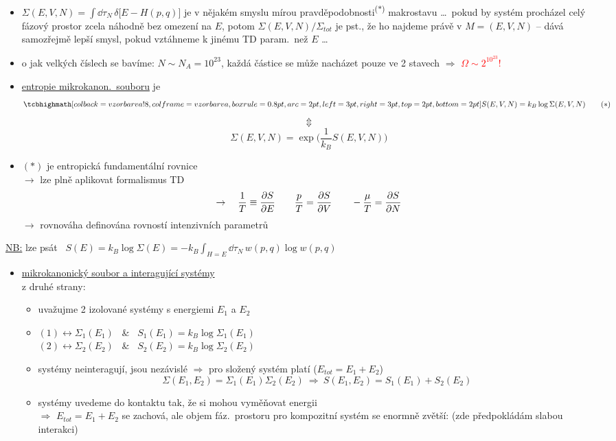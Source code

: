 \begin{itemize}
  \item $\Sigma(E,V,N) = \int\dd\tau_N\,\delta\big[E - H(p,q)\big]$ je v nějakém smyslu mírou pravděpodobnosti\textsuperscript{\textcolor{NavyBlue}{($*$)}} makrostavu \dots\ pokud by systém procházel celý fázový prostor zcela náhodně bez omezení na $E$, potom $\Sigma(E,V,N)/\Sigma_{tot}$ je pst., že ho najdeme právě v $M = (E,V,N)$
        \textcolor{NavyBlue}{-- dává samozřejmě lepší smysl, pokud vztáhneme k jinému TD param.\ než $E$ \dots}
  \item o jak velkých číslech se bavíme: $N\sim N_A = 10^{23}$, každá částice se může nacházet pouze ve 2 stavech $\Rightarrow$ \textcolor{Red}{$\Omega\sim 2^{10^{23}}$!}
  \item \underline{entropie mikrokanon.\ souboru} je
  \[
    \vzorec{S(E,V,N) = k_B\log\Sigma(E,V,N)} \qquad (*)
  \]
  \[
    \Updownarrow
  \]
  \[
    \Sigma(E,V,N) = \exp\Big(\frac{1}{k_B}S(E,V,N)\Big)
  \]
  \item $(*)$ je entropická fundamentální rovnice \\
        $\to$ lze plně aplikovat formalismus TD
        \[
          \to\quad \frac1T \equiv \pdv{S}{E} \qquad \frac{p}{T} = \pdv{S}{V} \qquad -\frac{\mu}{T} = \pdv{S}{N}
        \]
        $\to$ rovnováha definována rovností intenzivních parametrů
\end{itemize}

\textcolor{NavyBlue}{\underline{NB:} lze psát \ $S(E) = k_B\log\Sigma(E) = -k_B\displaystyle\int_{H=E}\dd\tau_N\,w(p,q)\log w(p,q)$}

\begin{itemize}
  \item \underline{mikrokanonický soubor a interagující systémy} \\
        z druhé strany:
  \begin{itemize}[label=$\to$]
    \item uvažujme 2 izolované systémy s energiemi $E_1$ a $E_2$
    \item $(1)\leftrightarrow\Sigma_1(E_1)$ \ \& \ $S_1(E_1) = k_B\log\Sigma_1(E_1)$ \\
          $(2)\leftrightarrow\Sigma_2(E_2)$ \ \& \ $S_2(E_2) = k_B\log\Sigma_2(E_2)$
    \item systémy neinteragují, jsou nezávislé $\Rightarrow$ pro složený systém platí ($E_{tot} = E_1 + E_2$)
          \[
            \Sigma(E_1,E_2) = \Sigma_1(E_1)\Sigma_2(E_2) \ \Rightarrow\ S(E_1,E_2) = S_1(E_1) + S_2(E_2)
          \]
    \item systémy uvedeme do kontaktu tak, že si mohou vyměňovat energii \\
          $\Rightarrow$ $E_{tot} = E_1 + E_2$ se zachová, ale objem fáz.\ prostoru pro kompozitní systém se enormně zvětší:
          \hfill (zde předpokládám slabou interakci)
  \end{itemize}
\end{itemize}

